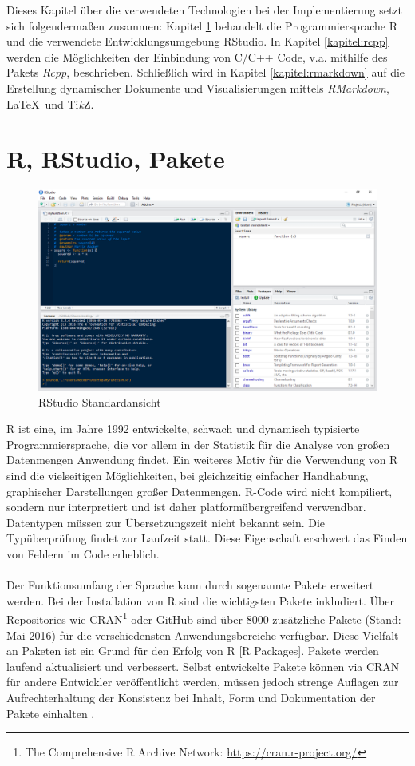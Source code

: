 Dieses Kapitel über die verwendeten Technologien bei der Implementierung setzt sich folgendermaßen zusammen: Kapitel \ref{kapitel:R} behandelt die Programmiersprache R und die verwendete Entwicklungsumgebung RStudio. In Kapitel \ref{kapitel:rcpp} werden die Möglichkeiten der Einbindung von C/C++ Code, v.a. mithilfe des Pakets \emph{Rcpp}, beschrieben. Schließlich wird in Kapitel \ref{kapitel:rmarkdown} auf die Erstellung dynamischer Dokumente und Visualisierungen mittels \emph{RMarkdown}, \LaTeX\ und Ti\textit{k}Z.
\section{R, RStudio, Pakete}
\label{kapitel:R}
\begin{figure}[!t]
\centering
\includegraphics[width=\ScaleIfNeeded]{abbildungen/rstudio}
\caption{RStudio Standardansicht}
\label{abb:rstudio}
\end{figure}
R ist eine, im Jahre 1992 entwickelte, schwach und dynamisch typisierte Programmiersprache, die vor allem in der Statistik für die Analyse von großen Datenmengen Anwendung findet. Ein weiteres Motiv für die Verwendung von R sind die vielseitigen Möglichkeiten, bei gleichzeitig einfacher Handhabung, graphischer Darstellungen großer Datenmengen. R-Code wird nicht kompiliert, sondern nur interpretiert und ist daher platformübergreifend verwendbar. Datentypen müssen zur Übersetzungszeit nicht bekannt sein. Die Typüberprüfung findet zur Laufzeit statt. Diese Eigenschaft erschwert das Finden von Fehlern im Code erheblich.
\\
\\
Der Funktionsumfang der Sprache kann durch sogenannte Pakete erweitert werden. Bei der Installation von R sind die wichtigsten Pakete inkludiert. Über Repositories wie CRAN\footnote{The Comprehensive R Archive Network: \url{https://cran.r-project.org/}} oder GitHub sind über 8000 zusätzliche Pakete (Stand: Mai 2016) für die verschiedensten Anwendungsbereiche verfügbar. Diese Vielfalt an Paketen ist ein Grund für den Erfolg von R [R Packages]. Pakete werden laufend aktualisiert und verbessert. Selbst entwickelte Pakete können via CRAN für andere Entwickler veröffentlicht werden, müssen jedoch strenge Auflagen zur Aufrechterhaltung der Konsistenz bei Inhalt, Form und Dokumentation der Pakete einhalten \cite{rmanual}.  
